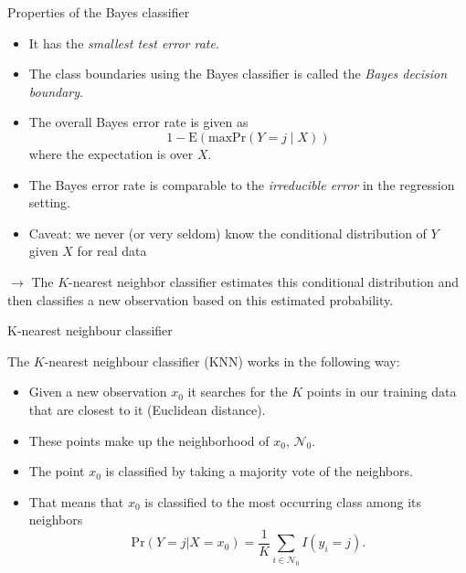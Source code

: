 \documentclass[10pt,ignorenonframetext,]{beamer}
\providecommand{\tightlist}{%
  \setlength{\itemsep}{0pt}\setlength{\parskip}{0pt}}
\begin{document}
\begin{frame}

\begin{block}{Properties of the Bayes classifier}

\begin{itemize}
\item
  It has the \emph{smallest test error rate}.
\item
  The class boundaries using the Bayes classifier is called the
  \emph{Bayes decision boundary}.
\item
  The overall Bayes error rate is given as
  \[1-\text{E}(\text{max} \text{Pr}(Y=j\mid X))\] where the expectation
  is over \(X\).
\item
  The Bayes error rate is comparable to the \emph{irreducible error} in
  the regression setting.
\item
  Caveat: we never (or very seldom) know the conditional distribution of
  \(Y\) given \(X\) for real data
\end{itemize}

\(\rightarrow\) The \(K\)-nearest neighbor classifier estimates this
conditional distribution and then classifies a new observation based on
this estimated probability.

\end{block}

\end{frame}

\begin{frame}

\begin{block}{K-nearest neighbour classifier}

\vspace{2mm} The \(K\)-nearest neighbour classifier (KNN) works in the
following way:

\begin{itemize}
\tightlist
\item
  Given a new observation \(x_0\) it searches for the \(K\) points in
  our training data that are closest to it (Euclidean distance).
\item
  These points make up the neighborhood of \(x_0\), \(\mathcal{N}_0\).
\item
  The point \(x_0\) is classified by taking a majority vote of the
  neighbors.
\item
  That means that \(x_0\) is classified to the most occurring class
  among its neighbors
  \[\text{Pr}(Y=j | X = x_0) = \frac{1}{K} \sum_{i \in \mathcal{N}_0} I(y_i = j).\]
\end{itemize}

\end{block}

\end{frame}
\end{document}
